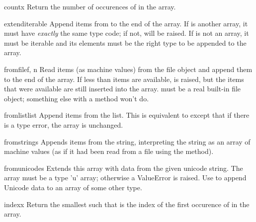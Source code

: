 \begin{methoddesc}[array]{count}{x}
Return the number of occurences of  in the array.
\end{methoddesc}

\begin{methoddesc}[array]{extend}{iterable}
Append items from  to the end of the array.  If
 is another array, it must have \emph{exactly} the same
type code; if not,  will be raised.  If
 is not an array, it must be iterable and its
elements must be the right type to be appended to the array.
\end{methoddesc}

\begin{methoddesc}[array]{fromfile}{f, n}
Read  items (as machine values) from the file object 
and append them to the end of the array.  If less than  items
are available,  is raised, but the items that were
available are still inserted into the array.   must be a real
built-in file object; something else with a  method won't
do.
\end{methoddesc}

\begin{methoddesc}[array]{fromlist}{list}
Append items from the list.  This is equivalent to
except that if there is a type error, the array is unchanged.
\end{methoddesc}

\begin{methoddesc}[array]{fromstring}{s}
Appends items from the string, interpreting the string as an
array of machine values (as if it had been read from a
file using the  method).
\end{methoddesc}

\begin{methoddesc}[array]{fromunicode}{s}
Extends this array with data from the given unicode string.
The array must be a type 'u' array; otherwise a ValueError
is raised.  Use  to
append Unicode data to an array of some other type.
\end{methoddesc}

\begin{methoddesc}[array]{index}{x}
Return the smallest  such that  is the index of
the first occurence of  in the array.
\end{methoddesc}

